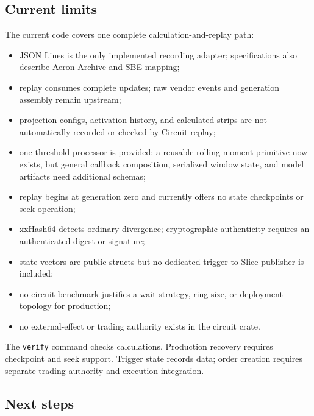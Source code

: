 \documentclass{strategynet-journal}
\newcommand{\SLICE}{\textsf{Slice}}
\begin{document}
\clearpage
\begin{SNcolumns}
\subsection{Current limits}

The current code covers one complete calculation-and-replay path:
\begin{itemize}
  \item JSON Lines is the only implemented recording adapter; specifications
        also describe Aeron Archive and SBE mapping;
  \item replay consumes complete updates; raw vendor events and generation
        assembly remain upstream;
  \item projection configs, activation history, and calculated strips are not
        automatically recorded or checked by Circuit replay;
  \item one threshold processor is provided; a reusable rolling-moment
        primitive now exists, but general callback composition, serialized
        window state, and model artifacts need additional schemas;
  \item replay begins at generation zero and currently offers no state
        checkpoints or seek operation;
  \item xxHash64 detects ordinary divergence; cryptographic authenticity
        requires an authenticated digest or signature;
  \item state vectors are public structs but no dedicated trigger-to-\SLICE{}
        publisher is included;
  \item no circuit benchmark justifies a wait strategy, ring size, or deployment
        topology for production;
  \item no external-effect or trading authority exists in the circuit crate.
\end{itemize}

The \texttt{verify} command checks calculations.  Production recovery requires
checkpoint and seek support.  Trigger state records data; order creation requires
separate trading authority and execution integration.

\subsection{Next steps}


\end{SNcolumns}
\end{document}

